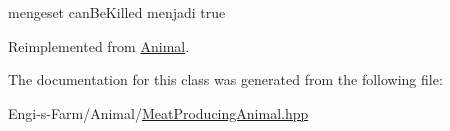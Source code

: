 mengeset can\+Be\+Killed menjadi true 

Reimplemented from \mbox{\hyperlink{class_animal_a87ada682cad67c91fb0cd0fda3395cd5}{Animal}}.



The documentation for this class was generated from the following file\+:\begin{DoxyCompactItemize}
\item 
Engi-\/s-\/\+Farm/\+Animal/\mbox{\hyperlink{_meat_producing_animal_8hpp}{Meat\+Producing\+Animal.\+hpp}}\end{DoxyCompactItemize}

